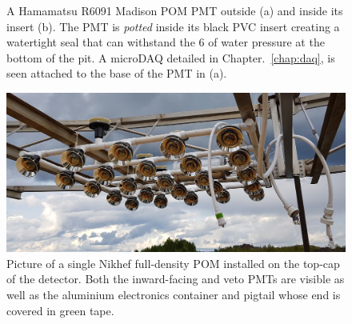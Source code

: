 \begin{figure} %
    \centering
    \quad
    \caption[Pictures of the Madison PMT assembly]
    {A Hamamatsu R6091 Madison POM PMT outside (a) and inside its insert (b). The PMT is
        \emph{potted} inside its black PVC insert creating a watertight seal that can withstand
        the \unit{6}{} of water pressure at the bottom of the pit. A microDAQ detailed
        in Chapter.~\ref{chap:daq}, is seen attached to the base of the PMT in (a).}
    \label{fig:madison_pmt_assembly}
\end{figure}

\begin{figure} %
    \includegraphics[width=\textwidth]{diagrams/4-chips/single_plane.jpg}
    \caption[Picture of a Nikhef Planar Optical Module]
    {Picture of a single Nikhef full-density POM installed on the top-cap of the \chipsfive
        detector. Both the inward-facing and veto PMTs are visible as well as the aluminium
        electronics container and pigtail whose end is covered in green tape.}
    \label{fig:single_plane}
\end{figure}

